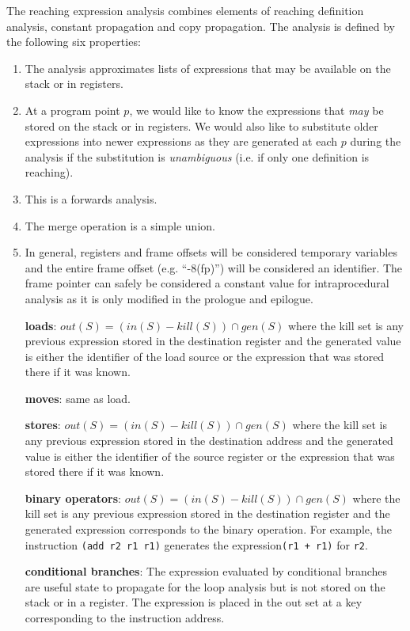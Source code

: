 The reaching expression analysis combines elements of reaching definition analysis, constant propagation and copy propagation. The analysis is defined by the following six properties:

\begin{enumerate}
  \item The analysis approximates lists of expressions that may be available on the stack or in registers.
  \item At a program point $p$, we would like to know the expressions that \textit{may} be stored on the stack or in registers.  We would also like to substitute older expressions into newer expressions as they are generated at each $p$ during the analysis if the substitution is \textit{unambiguous} (i.e. if only one definition is reaching).
  \item This is a forwards analysis.
  \item The merge operation is a simple union. 
  \item In general, registers and frame offsets will be considered temporary variables and the entire frame offset (e.g. ``-8(fp)'') will be considered an identifier. The frame pointer can safely be considered a constant value for intraprocedural analysis as it is only modified in the prologue and epilogue.
   
  \textbf{loads}: $out(S) = (in(S) - kill(S)) \cap gen(S)$ where the kill set is any previous expression stored in the destination register and the generated value is either the identifier of the load source or the expression that was stored there if it was known. 
  
  \textbf{moves}: same as load.
  
  \textbf{stores}: $out(S) = (in(S) - kill(S)) \cap gen(S)$ where the kill set is any previous expression stored in the destination address and the generated value is either the identifier of the source register or the expression that was stored there if it was known.
  
  \textbf{binary operators}: $out(S) = (in(S) - kill(S)) \cap gen(S)$ where the kill set is any previous expression stored in the destination register and the generated expression corresponds to the binary operation. For example, the instruction \texttt{(add r2 r1 r1)} generates the expression\texttt{(r1 + r1)} for \texttt{r2}.
  
  \textbf{conditional branches}: The expression evaluated by conditional branches are useful state to propagate for the loop analysis but is not stored on the stack or in a register. The expression is placed in the out set at a key corresponding to the instruction address.
  

\end{enumerate}
